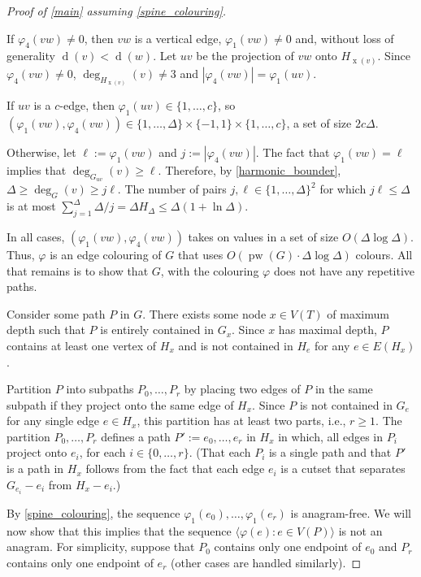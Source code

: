 \documentclass[kpfonts]{patmorin}
\DeclareMathOperator{\pw}{pw}
\DeclareMathOperator{\x}{x}
\DeclareMathOperator{\depth}{d}
\begin{document}
\begin{proof}[Proof of \cref{main} assuming \cref{spine_colouring}]
\begin{compactenum}
        \item If $\varphi_4(vw)\neq 0$, then $vw$ is a vertical edge, $\varphi_1(vw)\neq 0$ and, without loss of generality $\depth(v)<\depth(w)$. Let $uv$ be the projection of $vw$ onto $H_{\x(v)}$.  Since $\varphi_4(vw)\neq 0$, $\deg_{H_{\x(v)}}(v)\neq 3$ and $|\varphi_4(vw)|=\varphi_1(uv)$.
        \begin{compactenum}
            \item If $uv$ is a $c$-edge, then $\varphi_1(uv)\in\{1,\ldots,c\}$, so $(\varphi_1(vw),\varphi_4(vw))\in\{1,\ldots,\Delta\}\times\{-1,1\}\times\{1,\ldots,c\}$, a set of size $2c\Delta$.
            \item Otherwise, let $\ell:=\varphi_1(vw)$ and $j:=|\varphi_4(vw)|$. The fact that $\varphi_1(vw)=\ell$ implies that $\deg_{G_{uv}}(v)\ge\ell$.  Therefore, by \cref{harmonic_bounder}, $\Delta\ge \deg_G(v)\ge j\ell$.  The number of pairs $j,\ell\in\{1,\ldots,\Delta\}^2$ for which $j\ell\le\Delta$ is at most $\sum_{j=1}^{\Delta}\Delta/j=\Delta H_{\Delta}\le\Delta(1+\ln\Delta)$.
        \end{compactenum}
    \end{compactenum}
    In all cases, $(\varphi_1(vw),\varphi_4(vw))$ takes on values in a set of size $O(\Delta\log\Delta)$.  Thus, $\varphi$ is an edge colouring of $G$ that uses $O(\pw(G)\cdot\Delta\log\Delta)$ colours.  All that remains is to show that $G$, with the colouring $\varphi$ does not have any repetitive paths.

    Consider some path $P$ in $G$.  There exists some node $x\in V(T)$ of maximum depth such that $P$ is entirely contained in $G_x$.  Since $x$ has maximal depth, $P$ contains at least one vertex of $H_x$ and is not contained in $H_e$ for any $e\in E(H_x)$.

    Partition $P$ into subpaths $P_0,\ldots,P_r$ by placing two edges of $P$ in the same subpath if they project onto the same edge of $H_x$.  Since $P$ is not contained in $G_e$ for any single edge $e\in H_x$, this partition has at least two parts, i.e., $r\ge 1$.  The partition $P_0,\ldots,P_r$ defines a path $P':=e_0,\ldots,e_r$ in $H_x$ in which, all edges in $P_i$ project onto $e_i$, for each $i\in\{0,\ldots,r\}$. (That each $P_i$ is a single path and that $P'$ is a path in $H_x$ follows from the fact that each edge $e_i$ is a cutset that separates $G_{e_i}-e_i$ from $H_x-e_i$.)

    By \cref{spine_colouring}, the sequence $\varphi_1(e_0),\ldots,\varphi_1(e_r)$ is anagram-free.  We will now show that this implies that the sequence $\langle \varphi(e):e\in V(P)\rangle$ is not an anagram.  For simplicity, suppose that $P_{0}$ contains only one endpoint of $e_0$ and $P_r$ contains only one endpoint of $e_r$ (other cases are handled similarly).


\end{proof}
\end{document}
